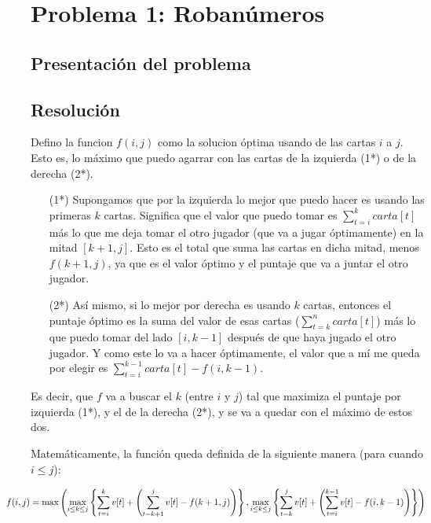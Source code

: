 \section{Problema 1: Roban\'umeros}

\subsection{Presentaci\'on del problema}

\subsection{Resoluci\'on}

Defino la funcion $f(i,j)$ como la solucion \'optima usando de las cartas $i$ a $j$. Esto es, lo m\'aximo que puedo agarrar con las cartas de la izquierda (1*) o de la derecha (2*). 

\begin{enumerate}
\item[(1*)] \label{x_izq} Supongamos que por la izquierda lo mejor que puedo hacer es usando las primeras $k$ cartas. Significa que el valor que puedo tomar es $\sum_{t=i}^{k} carta[t]$ m\'as lo que me deja tomar el otro jugador (que va a jugar \'optimamente) en la mitad $[k+1, j]$. Esto es el total que suma las cartas en dicha mitad, menos $f(k+1, j)$, ya que es el valor \'optimo y el puntaje que va a juntar el otro jugador. 

\item[(2*)] \label{x_der} As\'i mismo, si lo mejor por derecha es usando $k$ cartas, entonces el puntaje \'optimo es la suma del valor de esas cartas ($\sum_{t=k}^{n} carta[t]$) m\'as lo que puedo tomar del lado $[i, k-1]$ despu\'es de que haya jugado el otro jugador. Y como este lo va a hacer \'optimamente, el valor que a m\'i me queda por elegir es $\sum_{t=i}^{k-1} carta[t] - f(i,k-1)$. 
\end{enumerate}

Es decir, que $f$ va a buscar el $k$ (entre $i$ y $j$) tal que maximiza el puntaje por izquierda (1*), y el de la derecha (2*), y se va a quedar con el m\'aximo de estos dos.

Matem\'aticamente, la funci\'on queda definida de la siguiente manera (para cuando $i \leq j$): 

$$\hspace*{-1cm} f(i,j) = \max\left( 
      \max_{i \leq k \leq j}\left\{ \sum_{t=i}^k v[t] + \left( \sum_{t=k+1}^{j} v[t] - f(k+1,j) \right) \right\},  
      \max_{i \leq k \leq j}\left\{ \sum_{t=k}^j v[t] + \left( \sum_{t=i}^{k-1} v[t] - f(i,k-1) \right) \right\} 
    \right) $$

